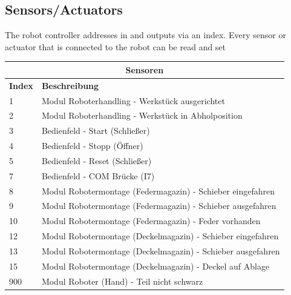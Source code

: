 \documentclass{article}
\begin{document}
\subsection{Sensors/Actuators}
The robot controller addresses in and outputs via an index. Every sensor or actuator that is connected to the robot can be read and set 
\begin{center}

	\setlength\extrarowheight{4pt}
	\small
	\begin{tabularx}{\textwidth}{|p{1cm}|X|}
		\hline
		\multicolumn{2}{|c|}{\bf \color{white} \large Sensoren}\\
		\hline\hline
		\bf Index & \bf Beschreibung\\
		\hline\hline
		1 & Modul Roboterhandling - Werkstück ausgerichtet\\
		\hline
		2 & Modul Roboterhandling - Werkstück in Abholposition\\
		\hline
		3 & Bedienfeld - Start (Schließer)\\
		\hline
		4 & Bedienfeld - Stopp (Öffner) \\
		\hline
		5 & Bedienfeld - Reset (Schließer)\\
		\hline
		7 & Bedienfeld - COM Brücke (I7)\\
		\hline
		8 & Modul Robotermontage (Federmagazin) - Schieber eingefahren\\
		\hline
		9 & Modul Robotermontage (Federmagazin) - Schieber ausgefahren\\
		\hline
		10 & Modul Robotermontage (Federmagazin) - Feder vorhanden \\
		\hline
		12 & Modul Robotermontage (Deckelmagazin) - Schieber eingefahren\\
		\hline
		13 & Modul Robotermontage (Deckelmagazin) - Schieber ausgefahren\\
		\hline
		15 & Modul Robotermontage (Deckelmagazin) - Deckel auf Ablage\\
		\hline
		900 & Modul Roboter (Hand) - Teil nicht schwarz\\
		\hline
	\end{tabularx}
\end{center}
\end{document}
